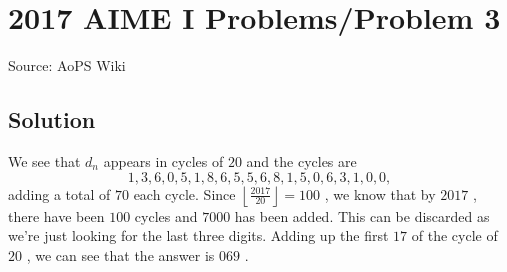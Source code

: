\documentclass[12pt]{article}
\begin{document}
\section*{{2017 AIME I Problems/Problem 3}}
Source: AoPS Wiki

\subsection*{Solution}
We see that $d_n$ appears in cycles of $20$ and the cycles are \[1,3,6,0,5,1,8,6,5,5,6,8,1,5,0,6,3,1,0,0,\] adding a total of $70$ each cycle.
Since $\left\lfloor\frac{2017}{20}\right\rfloor=100$ , we know that by $2017$ , there have been $100$ cycles and $7000$ has been added. This can be discarded as we're just looking for the last three digits.
Adding up the first $17$ of the cycle of $20$ , we can see that the answer is $\boxed{069}$ .
\end{document}
